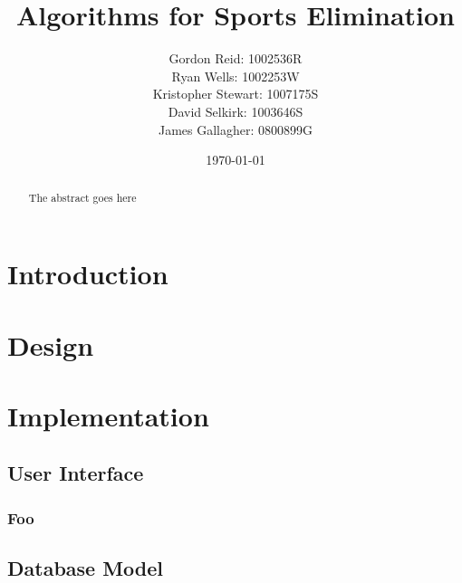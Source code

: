 \documentclass{l3proj}
\begin{document}
\title{Algorithms for Sports Elimination}
\author{
    Gordon Reid: 1002536R\\
    Ryan Wells: 1002253W\\
    Kristopher Stewart: 1007175S\\
    David Selkirk: 1003646S\\
    James Gallagher: 0800899G\\
}\date{\today}
\maketitle
\begin{abstract}

The abstract goes here

\end{abstract}
\educationalconsent
\tableofcontents
\chapter{Introduction}
\label{intro}

\chapter{Design}
\label{design}

\chapter{Implementation}
\label{impl}

\section{User Interface}

\subsection{Foo}

\section{Database Model}
\end{document}
